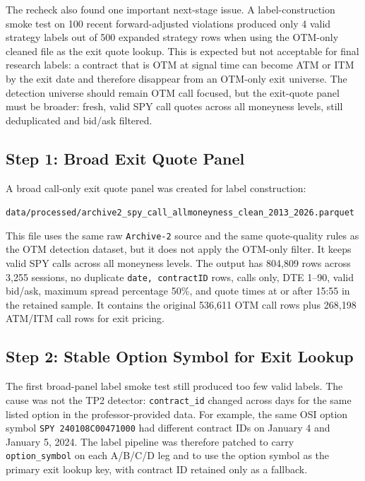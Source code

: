 \documentclass[11pt]{article}
\begin{document}
The recheck also found one important next-stage issue. A label-construction
smoke test on 100 recent forward-adjusted violations produced only 4 valid
strategy labels out of 500 expanded strategy rows when using the OTM-only
cleaned file as the exit quote lookup. This is expected but not acceptable for
final research labels: a contract that is OTM at signal time can become ATM or
ITM by the exit date and therefore disappear from an OTM-only exit universe.
The detection universe should remain OTM call focused, but the exit-quote panel
must be broader: fresh, valid SPY call quotes across all moneyness levels, still
deduplicated and bid/ask filtered.

\subsection*{Step 1: Broad Exit Quote Panel}

A broad call-only exit quote panel was created for label construction:

\begin{center}
\texttt{data/processed/archive2\_spy\_call\_allmoneyness\_clean\_2013\_2026.parquet}
\end{center}

This file uses the same raw \texttt{Archive-2} source and the same quote-quality
rules as the OTM detection dataset, but it does not apply the OTM-only filter.
It keeps valid SPY calls across all moneyness levels. The output has 804,809
rows across 3,255 sessions, no duplicate \texttt{date, contractID} rows, calls
only, DTE 1--90, valid bid/ask, maximum spread percentage 50\%, and quote times
at or after 15:55 in the retained sample. It contains the original 536,611 OTM
call rows plus 268,198 ATM/ITM call rows for exit pricing.

\subsection*{Step 2: Stable Option Symbol for Exit Lookup}

The first broad-panel label smoke test still produced too few valid labels.
The cause was not the TP2 detector: \texttt{contract\_id} changed across days for
the same listed option in the professor-provided data. For example, the same
OSI option symbol \texttt{SPY 240108C00471000} had different contract IDs on
January 4 and January 5, 2024. The label pipeline was therefore patched to carry
\texttt{option\_symbol} on each A/B/C/D leg and to use the option symbol as the
primary exit lookup key, with contract ID retained only as a fallback.
\end{document}
